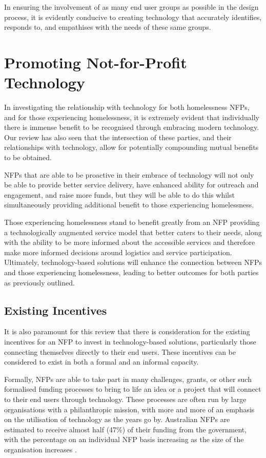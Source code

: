 In ensuring the involvement of as many end user groups as possible in the design process, it is evidently conducive to creating technology that accurately identifies, responds to, and empathises with the needs of these same groups.

\section{Promoting Not-for-Profit Technology}

In investigating the relationship with technology for both homelessness NFPs, and for those experiencing homelessness, it is extremely evident that individually there is immense benefit to be recognised through embracing modern technology. Our review has also seen that the intersection of these parties, and their relationships with technology, allow for potentially compounding mutual benefits to be obtained. 

NFPs that are able to be proactive in their embrace of technology will not only be able to provide better service delivery, have enhanced ability for outreach and engagement, and raise more funds, but they will be able to do this whilst simultaneously providing additional benefit to those experiencing homelessness. 

Those experiencing homelessness stand to benefit greatly from an NFP providing a technologically augmented service model that better caters to their needs, along with the ability to be more informed about the accessible services and therefore make more informed decisions around logistics and service participation. Ultimately, technology-based solutions will enhance the connection between NFPs and those experiencing homelessness, leading to better outcomes for both parties as previously outlined.

\subsection{Existing Incentives}

It is also paramount for this review that there is consideration for the existing incentives for an NFP to invest in technology-based solutions, particularly those connecting themselves directly to their end users. These incentives can be considered to exist in both a formal and an informal capacity.

Formally, NFPs are able to take part in many challenges, grants, or other such formalised funding processes to bring to life an idea or a project that will connect to their end users through technology. These processes are often run by large organisations with a philanthropic mission, with more and more of an emphasis on the utilisation of technology as the years go by. Australian NFPs are estimated to receive almost half (47\%) of their funding from the government, with the percentage on an individual NFP basis increasing as the size of the organisation increases \cite{acnc2020}.

